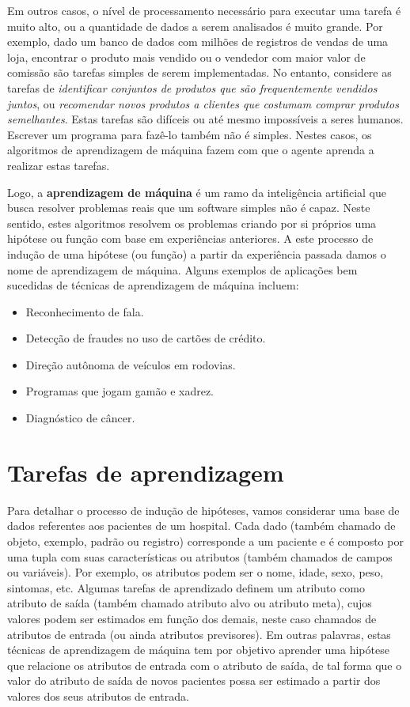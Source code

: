 Em outros casos, o nível de processamento necessário para executar uma tarefa é muito alto, ou a quantidade de dados a serem analisados é muito grande. Por exemplo, dado um banco de dados com milhões de registros de vendas de uma loja, encontrar o produto mais vendido ou o vendedor com maior valor de comissão são tarefas simples de serem implementadas. No entanto, considere as tarefas de \textit{identificar conjuntos de produtos que são frequentemente vendidos juntos}, ou \textit{recomendar novos produtos a clientes que costumam comprar produtos semelhantes}. Estas tarefas são difíceis ou até mesmo impossíveis a seres humanos. Escrever um programa para fazê-lo também não é simples. Nestes casos, os algoritmos de aprendizagem de máquina fazem com que o agente aprenda a realizar estas tarefas.

Logo, a \textbf{aprendizagem de máquina} é um ramo da inteligência artificial que busca resolver problemas reais que um software simples não é capaz. Neste sentido, estes algoritmos resolvem os problemas criando por si próprios uma hipótese ou função com base em experiências anteriores. A este processo de indução de uma hipótese (ou função) a partir da experiência passada damos o nome de aprendizagem de máquina. Alguns exemplos de aplicações bem sucedidas de técnicas de aprendizagem de máquina incluem:

\begin{itemize}
	\item Reconhecimento de fala.
	\item Detecção de fraudes no uso de cartões de crédito.
	\item Direção autônoma de veículos em rodovias.
	\item Programas que jogam gamão e xadrez.
	\item Diagnóstico de câncer.
\end{itemize}


\section{Tarefas de aprendizagem}

Para detalhar o processo de indução de hipóteses, vamos considerar uma base de dados referentes aos pacientes de um hospital. Cada dado (também chamado de objeto, exemplo, padrão ou registro) corresponde a um paciente e é composto por uma tupla com suas características ou atributos (também chamados de campos ou variáveis). Por exemplo, os atributos podem ser o nome, idade, sexo, peso, sintomas, etc. Algumas tarefas de aprendizado definem um atributo como atributo de saída (também chamado atributo alvo ou atributo meta), cujos valores podem ser estimados em função dos demais, neste caso chamados de atributos de entrada (ou ainda atributos previsores). Em outras palavras, estas técnicas de aprendizagem de máquina tem por objetivo aprender uma hipótese que relacione os atributos de entrada com o atributo de saída, de tal forma que o valor do atributo de saída de novos pacientes possa ser estimado a partir dos valores dos seus atributos de entrada.

